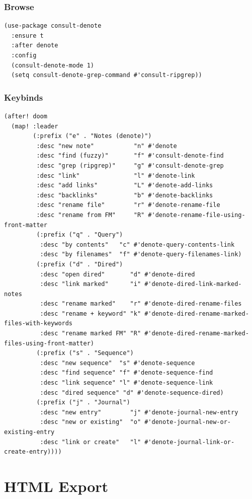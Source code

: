 \documentclass[11pt]{article}
\begin{document}
\subsubsection{Browse}
\label{sec:org2f12a30}
\begin{verbatim}
(use-package consult-denote
  :ensure t
  :after denote
  :config
  (consult-denote-mode 1)
  (setq consult-denote-grep-command #'consult-ripgrep))
\end{verbatim}
\subsubsection{Keybinds}
\label{sec:org5009a78}
\begin{verbatim}
(after! doom
  (map! :leader
        (:prefix ("e" . "Notes (denote)")
         :desc "new note"           "n" #'denote
         :desc "find (fuzzy)"       "f" #'consult-denote-find
         :desc "grep (ripgrep)"     "g" #'consult-denote-grep
         :desc "link"               "l" #'denote-link
         :desc "add links"          "L" #'denote-add-links
         :desc "backlinks"          "b" #'denote-backlinks
         :desc "rename file"        "r" #'denote-rename-file
         :desc "rename from FM"     "R" #'denote-rename-file-using-front-matter
         (:prefix ("q" . "Query")
          :desc "by contents"   "c" #'denote-query-contents-link
          :desc "by filenames"  "f" #'denote-query-filenames-link)
         (:prefix ("d" . "Dired")
          :desc "open dired"       "d" #'denote-dired
          :desc "link marked"      "i" #'denote-dired-link-marked-notes
          :desc "rename marked"    "r" #'denote-dired-rename-files
          :desc "rename + keyword" "k" #'denote-dired-rename-marked-files-with-keywords
          :desc "rename marked FM" "R" #'denote-dired-rename-marked-files-using-front-matter)
         (:prefix ("s" . "Sequence")
          :desc "new sequence"  "s" #'denote-sequence
          :desc "find sequence" "f" #'denote-sequence-find
          :desc "link sequence" "l" #'denote-sequence-link
          :desc "dired sequence" "d" #'denote-sequence-dired)
         (:prefix ("j" . "Journal")
          :desc "new entry"        "j" #'denote-journal-new-entry
          :desc "new or existing"  "o" #'denote-journal-new-or-existing-entry
          :desc "link or create"   "l" #'denote-journal-link-or-create-entry))))
\end{verbatim}
\section{HTML Export}
\label{sec:org1a4ec06}
\end{document}
